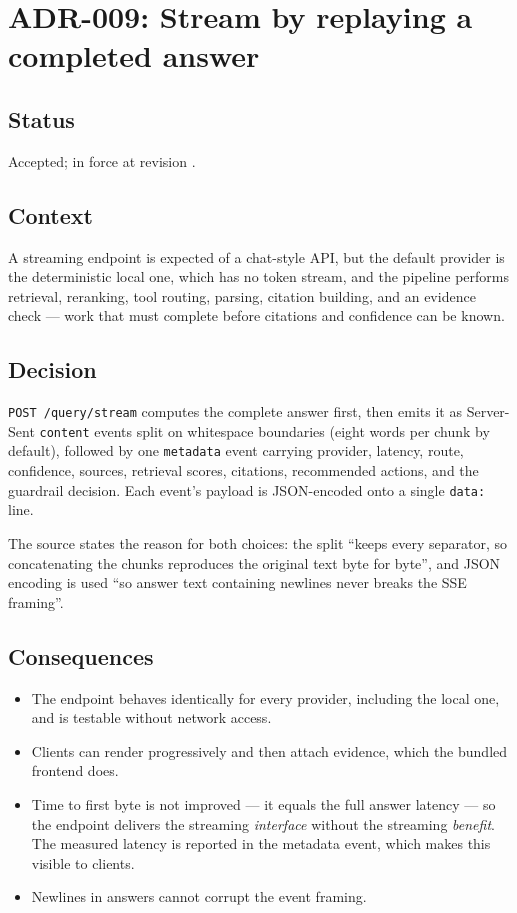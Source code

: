 \section{ADR-009: Stream by replaying a completed answer}
\label{adr:009}

\subsection*{Status}

Accepted; in force at revision \texttt{\projectrevisionshort}.

\subsection*{Context}

A streaming endpoint is expected of a chat-style API, but the default provider
is the deterministic local one, which has no token stream, and the pipeline
performs retrieval, reranking, tool routing, parsing, citation building, and an
evidence check --- work that must complete before citations and confidence can
be known.

\subsection*{Decision}

\texttt{POST /query/stream} computes the complete answer first, then emits it
as Server-Sent \texttt{content} events split on whitespace boundaries
(eight words per chunk by default), followed by one \texttt{metadata} event
carrying provider, latency, route, confidence, sources, retrieval scores,
citations, recommended actions, and the guardrail decision. Each event's
payload is JSON-encoded onto a single \texttt{data:} line.

The source states the reason for both choices: the split ``keeps every
separator, so concatenating the chunks reproduces the original text byte for
byte'', and JSON encoding is used ``so answer text containing newlines never
breaks the SSE framing''.

\subsection*{Consequences}

\begin{itemize}
  \item The endpoint behaves identically for every provider, including the
    local one, and is testable without network access.
  \item Clients can render progressively and then attach evidence, which the
    bundled frontend does.
  \item Time to first byte is not improved --- it equals the full answer
    latency --- so the endpoint delivers the streaming \emph{interface} without
    the streaming \emph{benefit}. The measured latency is reported in the
    metadata event, which makes this visible to clients.
  \item Newlines in answers cannot corrupt the event framing.
\end{itemize}

